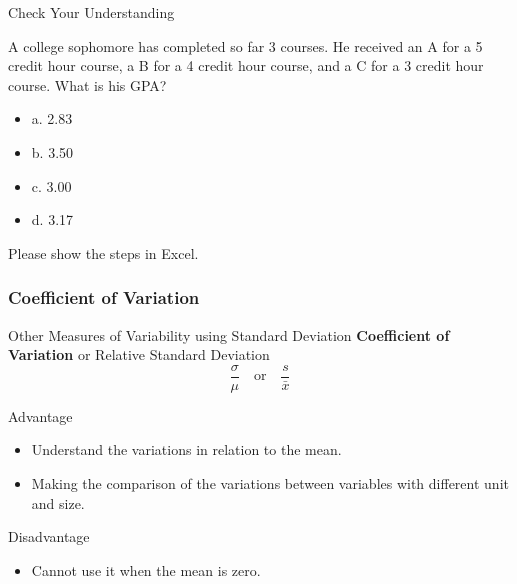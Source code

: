 \documentclass{beamer}
\begin{document}
\begin{frame}{Check Your Understanding}

A college sophomore has completed so far 3 courses. He received an A for a 5 credit hour course, a B for a 4 credit hour course, and a C for a 3 credit hour course.  What is his GPA?

\begin{itemize}
\item a.	2.83
\item b.	3.50
\item c.	3.00
\item d.	3.17

\end{itemize}

\vspace{0.5 cm}
Please show the steps in Excel.


\end{frame}


\subsubsection{Coefficient of Variation}
\begin{frame}{Other Measures of Variability using Standard Deviation}
\textbf{Coefficient of Variation} or Relative Standard Deviation
$$ \frac{\sigma}{\mu} \quad\text{or}\quad \frac{s}{\bar{x}} $$

Advantage
\begin{itemize}
\item Understand the variations in relation to the mean.
\item Making the comparison of the variations between variables with different unit and size.
\end{itemize}

Disadvantage
\begin{itemize}
\item Cannot use it when the mean is zero. 
\end{itemize}


\end{frame}
\end{document}
